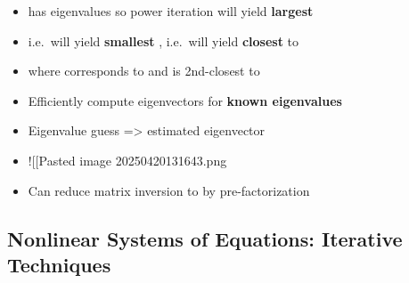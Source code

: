 \begin{itemize}
  \begin{itemize}
  
  \item
     has eigenvalues
     so power iteration will yield
    \textbf{largest }
  \item
    i.e.~will yield \textbf{smallest
    }, i.e.~will yield
     \textbf{closest} to \iMbox{\sigma}
  \item
    where  corresponds to
     and  is
    2nd-closest to \iMbox{\sigma}
  \item
    Efficiently compute eigenvectors for \textbf{known eigenvalues}
    \iMbox{\sigma}
  \item
    Eigenvalue guess =\textgreater{} estimated eigenvector
  \item
    !{[}{[}Pasted image 20250420131643.png\textbar300{]}{]}
  \item
    Can reduce matrix inversion  to  by
    pre-factorization
  \end{itemize}
\end{itemize}

\subsection*{Nonlinear Systems of Equations: Iterative
Techniques}

